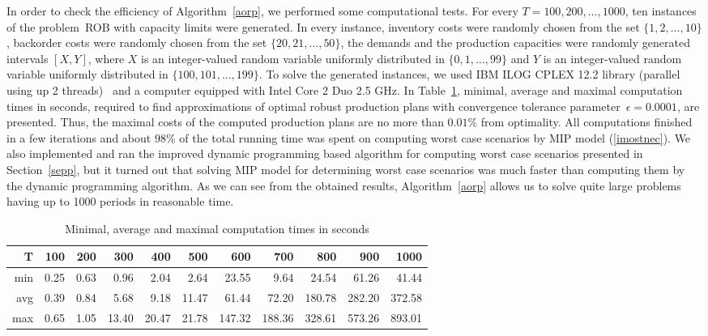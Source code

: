 \documentclass[11pt]{article}
\begin{document}
In order to check the efficiency of Algorithm~\ref{aorp},  we  performed some computational tests.
For every $T=100, 200, \ldots, 1000$, ten instances of the problem~\textsc{ROB} 
 with capacity limits
were generated.
 In every instance, inventory costs were randomly chosen from the set $\{1, 2, \ldots, 10\}$, backorder costs were randomly chosen from the set $\{20, 21, \ldots, 50\}$, the demands  and the production capacities
 were randomly generated  intervals $[X, Y]$, where $X$ is an integer-valued  random variable uniformly
 distributed in $\{0, 1, \ldots, 99\}$ and $Y$ is an integer-valued random variable uniformly
  distributed in $\{100, 101, \ldots, 199\}$. 
 To solve   the generated instances, we used  IBM ILOG CPLEX 12.2 library 
 (parallel using up 2 threads)~\cite{CPLEX} 
 and a
 computer equipped with Intel Core 2 Duo 2.5 GHz.
In Table~\ref{tab1new}, minimal, average and maximal computation times in seconds,
required to find approximations of  optimal robust production plans with 
convergence tolerance parameter~$\epsilon=0.0001$,
are presented. Thus,
 the maximal costs of the computed production plans are no more than $0.01\%$
from optimality.
All computations finished in a few iterations and about  $98\%$ of the total running time was spent on computing  worst case scenarios by MIP model (\ref{imostnec}).
We also  implemented and ran the improved dynamic programming based algorithm 
for computing  worst case scenarios presented in Section~\ref{sepp}, but
it turned out that solving MIP model for determining worst case scenarios
was much faster than  computing them
 by the dynamic programming algorithm.
As we can see from the obtained results, Algorithm~\ref{aorp} allows us to solve quite large problems having up to 1000 periods in reasonable time.


\begin{table}
\begin{small}
\setlength{\tabcolsep}{4pt}
\caption{Minimal, average and maximal computation times in seconds} 
\label{tab1new}
\begin{center}
\begin{tabular}{r|rrrrrrrrrr}
T & 100 &  200 & 300 & 400 & 500 &
 600 &  700 & 800 & 900 & 1000\\
\hline 
min & 0.25 & 0.63 & 0.96 & 2.04 & 2.64 
               & 23.55 & 9.64 & 24.54 & 61.26 &  41.44  \\ 
avg & 0.39 & 0.84 & 5.68 & 9.18 & 11.47 
                & 61.44 & 72.20 & 180.78  & 282.20 &  372.58 \\ 
max &0.65 & 1.05 & 13.40 & 20.47 & 21.78 
                & 147.32 & 188.36 & 328.61 & 573.26 & 893.01 
\end{tabular}
\end{center}
\end{small}
\end{table}
\end{document}

